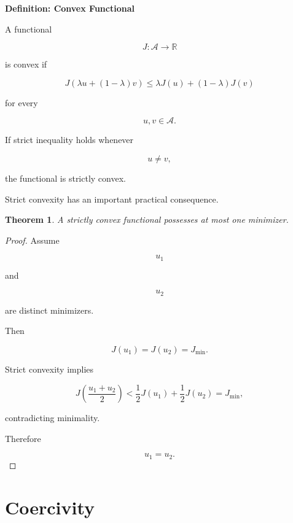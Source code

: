 \documentclass[11pt,fleqn]{book}
\numberwithin{equation}{chapter}
\newenvironment{definition}[1]
  {\begin{definitionEnv}
   \noindent\textbf{Definition: #1}\par\smallskip}
  {\end{definitionEnv}}
\theoremstyle{plain}
\newtheorem{theorem}{Theorem}[chapter]
\theoremstyle{definition}
\theoremstyle{remark}
\begin{document}
\begin{definition}{Convex Functional}

A functional

\[
J:\mathcal A\rightarrow\mathbb R
\]

is convex if

\[
J(\lambda u+(1-\lambda)v)
\le
\lambda J(u)
+
(1-\lambda)J(v)
\]

for every

\[
u,v\in\mathcal A.
\]

If strict inequality holds whenever

\[
u\neq v,
\]

the functional is strictly convex.

\end{definition}


Strict convexity has an important practical consequence.


\begin{theorem}

A strictly convex functional possesses at most one minimizer.

\end{theorem}

\begin{proof}

Assume

\[
u_1
\]

and

\[
u_2
\]

are distinct minimizers.

Then

\[
J(u_1)
=
J(u_2)
=
J_{\min}.
\]

Strict convexity implies

\[
J
\left(
\frac{u_1+u_2}{2}
\right)
<
\frac12
J(u_1)
+
\frac12
J(u_2)
=
J_{\min},
\]

contradicting minimality.

Therefore

\[
u_1=u_2.
\]

\end{proof}


\section{Coercivity}
\end{document}
